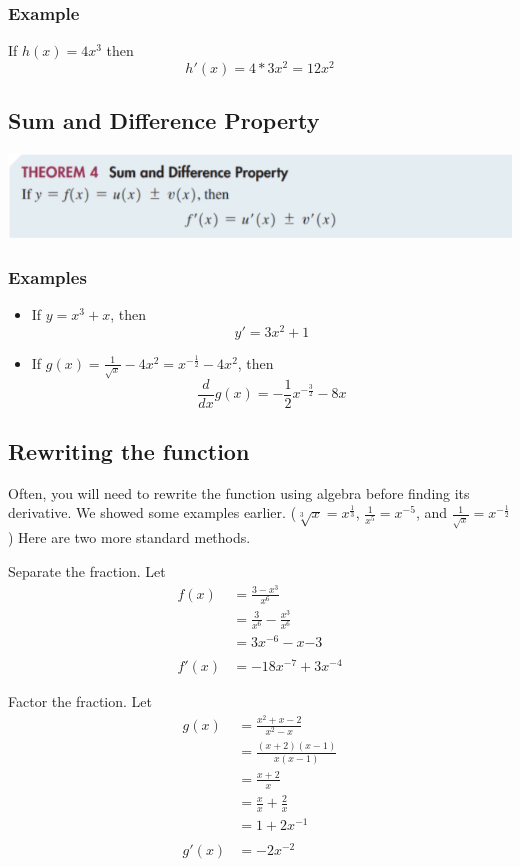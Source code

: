 \documentclass[14pt]{extarticle}
\begin{document}
\subsubsection{Example}
If $h(x) = 4x^3$ then $$h'(x) = 4*3x^2 = 12x^2$$


\subsection{Sum and Difference Property}
\begin{center}
	\includegraphics[width=0.9\linewidth]{9-5-5}
\end{center}
\subsubsection{Examples}
\begin{itemize}
	\item If $y = x^3 + x$, then
	$$y' = 3x^2+ 1$$
	\item If $g(x) = \frac{1}{\sqrt{x}} - 4x^2 = x^{-\frac{1}{2}} - 4x^2$, then
	$$ \frac{d}{dx}g(x) = -\frac{1}{2}x^{-\frac{3}{2}} - 8x$$
\end{itemize}

\subsection{Rewriting the function}
Often, you will need to rewrite the function using algebra before finding its derivative. We showed some examples earlier. ($\sqrt[3]{x} = x^{\frac{1}{3}}$, $\frac{1}{x^5} = x^{-5}$, and $\frac{1}{\sqrt{x}} = x^{-\frac{1}{2}}$) Here are two more standard methods.

Separate the fraction. Let
\begin{align*}
	f(x) &= \frac{3-x^3}{x^6} \\
	&= \frac{3}{x^6} - \frac{x^3}{x^6} \\
	&= 3x^{-6} - x{-3} \\\\
	f'(x) &= -18x^{-7} + 3x^{-4}
\end{align*}

Factor the fraction. Let
\begin{align*}
	g(x) & = \frac{x^2 +x -2}{x^2 -x} \\
	&= \frac{(x+2)(x-1)}{x(x-1)} \\
	&= \frac{x+2}{x} \\
	&= \frac{x}{x} + \frac{2}{x} \\
	&= 1 +2x^{-1} \\\\
	g'(x) & = -2x^{-2}
\end{align*}
\end{document}
